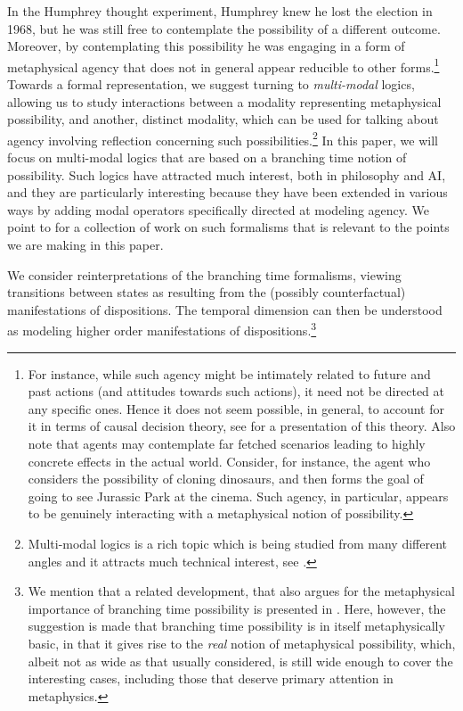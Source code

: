 \documentclass{article}
\begin{document}
In the Humphrey thought experiment, Humphrey knew he lost the election in 1968, but he was still free to contemplate the possibility of a different outcome. Moreover, by contemplating this possibility he was engaging in a form of metaphysical agency that does not in general appear reducible to other forms.\footnote{For instance, while such agency might be intimately related to future and past actions (and attitudes towards such actions), it need not be directed at any specific ones. Hence it does not seem possible, in general, to account for it in terms of causal decision theory, see \cite{joyce} for a presentation of this theory. Also note that agents may contemplate far fetched scenarios leading to highly concrete effects in the actual world. Consider, for instance, the agent who considers the possibility of cloning dinosaurs, and then forms the goal of going to see Jurassic Park at the cinema. Such agency, in particular, appears to be genuinely interacting with a metaphysical notion of possibility.} Towards a formal representation, we suggest turning to \emph{multi-modal} logics, allowing us to study interactions between a modality representing metaphysical possibility, and another, distinct modality, which can be used for talking about agency involving reflection concerning such possibilities.\footnote{Multi-modal logics is a rich topic which is being studied from many different angles and it attracts much technical interest, see \cite{multimod}.} In this paper, we will focus on multi-modal logics that are based on a branching time notion of possibility. Such logics have attracted much interest, both in philosophy and AI, and they are particularly interesting because they have been extended in various ways by adding modal operators specifically directed at modeling agency. We point to \cite{stit,dstit,atle,nctl,stitstart} for a collection of work on such formalisms that is relevant to the points we are making in this paper.

We consider reinterpretations of the branching time formalisms, viewing transitions between states as resulting from the (possibly counterfactual) manifestations of dispositions. The temporal dimension can then be understood as modeling higher order manifestations of dispositions.\footnote{We mention that a related development, that also argues for the metaphysical importance of branching time possibility is presented in \cite{realmod}. Here, however, the suggestion is made that branching time possibility is in itself metaphysically basic, in that it gives rise to the \emph{real} notion of metaphysical possibility, which, albeit not as wide as that usually considered, is still wide enough to cover the interesting cases, including those that deserve primary attention in metaphysics.}
\end{document}
